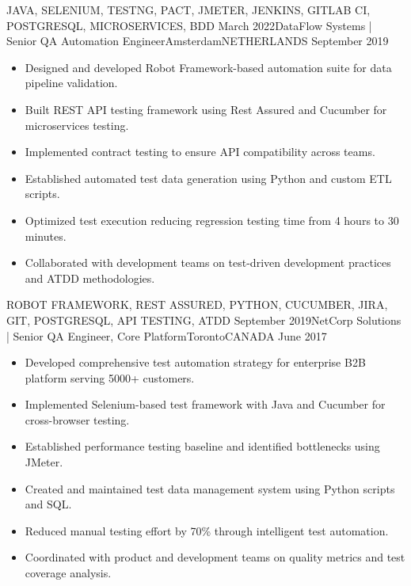 \begin{experiences}
{\begin{itemize}
           \end{itemize}
        }
        {JAVA, SELENIUM, TESTNG, PACT, JMETER, JENKINS, GITLAB CI, POSTGRESQL, MICROSERVICES, BDD}
  \emptySeparator
  \experience
    {March 2022}{DataFlow Systems | Senior QA Automation Engineer}{Amsterdam}{NETHERLANDS} {September 2019} {
           \begin{itemize}
               \item Designed and developed Robot Framework-based automation suite for data pipeline validation.
               \item Built REST API testing framework using Rest Assured and Cucumber for microservices testing.
               \item Implemented contract testing to ensure API compatibility across teams.
               \item Established automated test data generation using Python and custom ETL scripts.
               \item Optimized test execution reducing regression testing time from 4 hours to 30 minutes.
               \item Collaborated with development teams on test-driven development practices and ATDD methodologies.
           \end{itemize}
        }
        {ROBOT FRAMEWORK, REST ASSURED, PYTHON, CUCUMBER, JIRA, GIT, POSTGRESQL, API TESTING, ATDD}
  \emptySeparator
  \experience
    {September 2019}{NetCorp Solutions | Senior QA Engineer, Core Platform}{Toronto}{CANADA} {June 2017} {
            \begin{itemize}
                \item Developed comprehensive test automation strategy for enterprise B2B platform serving 5000+ customers.
                \item Implemented Selenium-based test framework with Java and Cucumber for cross-browser testing.
                \item Established performance testing baseline and identified bottlenecks using JMeter.
                \item Created and maintained test data management system using Python scripts and SQL.
                \item Reduced manual testing effort by 70\% through intelligent test automation.
                \item Coordinated with product and development teams on quality metrics and test coverage analysis.
            \end{itemize}
}
\end{experiences}
